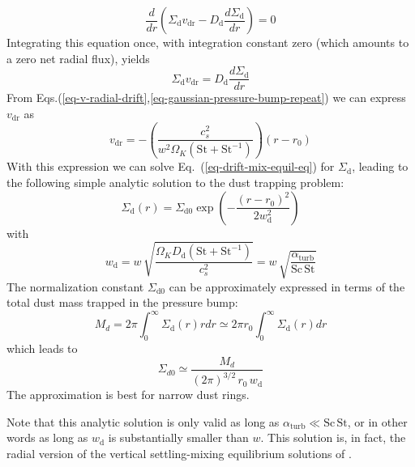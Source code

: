 \documentclass{aa}
\begin{document}
\begin{equation}
  \frac{d}{dr}
  \left(\Sigma_{\mathrm{d}}v_{\mathrm{dr}}-D_{\mathrm{d}}\frac{d\Sigma_{\mathrm{d}}}{dr}\right) = 0
\end{equation}
Integrating this equation once, with integration constant zero (which
amounts to a zero net radial flux), yields
\begin{equation}\label{eq-drift-mix-equil-eq}
  \Sigma_{\mathrm{d}}v_{\mathrm{dr}} = D_{\mathrm{d}}\frac{d\Sigma_{\mathrm{d}}}{dr}
\end{equation}
From Eqs.(\ref{eq-v-radial-drift},\ref{eq-gaussian-pressure-bump-repeat}) we can express
$v_{\mathrm{dr}}$ as
\begin{equation}
v_{\mathrm{dr}} = -\left(\frac{c_s^2}{w^2\Omega_K(\mathrm{St}+\mathrm{St}^{-1})}\right)(r-r_0)
\end{equation}
With this expression we can solve Eq.~(\ref{eq-drift-mix-equil-eq}) for
$\Sigma_{\mathrm{d}}$, leading to the following simple analytic solution to the dust
trapping problem:
\begin{equation}\label{eq-analytic-sol-radial-trapping}
\Sigma_{\mathrm{d}}(r) = \Sigma_{\mathrm{d0}} \exp\left(-\frac{(r-r_0)^2}{2w_{\mathrm{d}}^2}\right)
\end{equation}
with 
\begin{equation}
  w_{\mathrm{d}} = w\, \sqrt{\frac{\Omega_KD_{\mathrm{d}}(\mathrm{St}+\mathrm{St}^{-1})}{c_s^2}}
  = w\,\sqrt{\frac{\alpha_{\mathrm{turb}}}{\mathrm{Sc}\,\mathrm{St}}}
\end{equation}
The normalization constant $\Sigma_{\mathrm{d0}}$ can be approximately expressed
in terms of the total dust mass trapped in the pressure bump:
\begin{equation}
  M_d = 2\pi \int_0^\infty \Sigma_{\mathrm{d}}(r) rdr \simeq
  2\pi r_0 \int_0^\infty \Sigma_{\mathrm{d}}(r)dr
\end{equation}
which leads to
\begin{equation}
\Sigma_{d0}\simeq \frac{M_d}{(2\pi)^{3/2}\, r_0\,w_{\mathrm{d}}}
\end{equation}
The approximation is best for narrow dust rings.

Note that this analytic solution is only valid as long as
$\alpha_{\mathrm{turb}}\ll \mathrm{Sc}\,\mathrm{St}$, or in other words as long
as $w_{\mathrm{d}}$ is substantially smaller than $w$.  This solution is, in
fact, the radial version of the vertical settling-mixing equilibrium solutions
of \citet{1995Icar..114..237D}.
\end{document}
